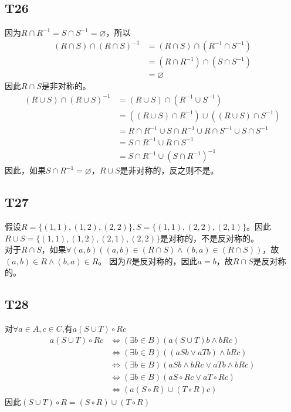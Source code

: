 \documentclass{article}
\begin{document}
\subsection{T26}
因为$R \cap R^{-1} = S \cap S^{-1} = \varnothing$，所以
\begin{align*}
    (R \cap S) \cap (R \cap S)^{-1} &= (R \cap S) \cap (R^{-1} \cap S^{-1})\\
    &= (R \cap R^{-1}) \cap (S \cap S^{-1})\\
    &= \varnothing
\end{align*}
因此$R \cap S$是非对称的。
\begin{align*}
    (R \cup S) \cap (R \cup S)^{-1} &= (R \cup S) \cap (R^{-1} \cup S^{-1})\\
    &= ((R \cup S) \cap R^{-1}) \cup ((R \cup S) \cap S^{-1})\\
    &= R \cap R^{-1} \cup S \cap R^{-1} \cup R \cap S^{-1} \cup S \cap S^{-1}\\
    &= S \cap R^{-1} \cup R \cap S^{-1}\\
    &= S \cap R^{-1} \cup (S \cap R^{-1})^{-1}
\end{align*}
因此，如果$S \cap R^{- 1} = \varnothing$，$R \cup S$是非对称的，反之则不是。
\subsection{T27}
假设$R = \{(1, 1), (1, 2), (2, 2)\}, S = \{(1, 1), (2, 2), (2, 1)\}$。因此
$R \cup S = \{(1, 1), (1, 2), (2, 1), (2, 2)\}$是对称的，不是反对称的。\\
对于$R \cap S$，如果$\forall (a, b) ((a, b) \in  (R \cap S) \land (b, a) \in (R \cap S))$，故$(a, b) \in R \land (b, a) \in R$。
因为$R$是反对称的，因此$a = b$，故$R \cap S$是反对称的。
\subsection{T28}
对$\forall a \in A, c \in C$,有$a (S \cup T) \circ R c$
\begin{align*}
    a(S \cup T) \circ Rc &\Leftrightarrow (\exists b \in B)(a(S \cup T)b \land bRc)\\
    &\Leftrightarrow (\exists b \in B)((aSb \lor aTb) \land bRc)\\
    &\Leftrightarrow (\exists b \in B)(aSb \land bRc \lor aTb \land bRc)\\
    &\Leftrightarrow (\exists b \in B)(a S \circ R c \lor a T \circ R c)\\
    &\Leftrightarrow (a (S \circ R) \cup (T \circ R)c)
\end{align*}因此$(S \cup T)\circ R = (S \circ R) \cup (T \circ R)$
\end{document}
